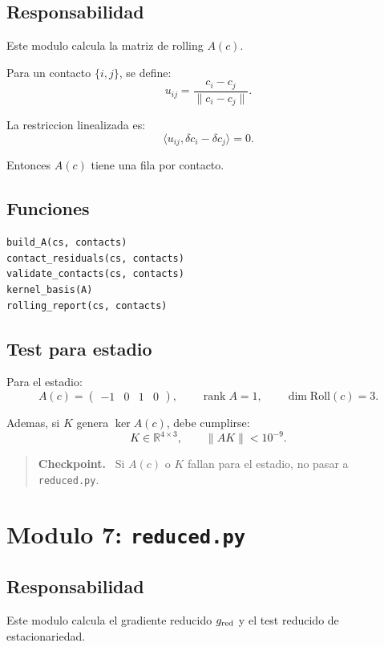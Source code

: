 \documentclass[11pt,letterpaper]{amsart}
\newcommand{\R}{\mathbb R}
\newcommand{\Roll}{\mathrm{Roll}}
\DeclareMathOperator{\Ker}{ker}
\DeclareMathOperator{\rank}{rank}
\newenvironment{checkpoint}
{\par\medskip\noindent\begin{quote}\textbf{Checkpoint.}\ }
{\end{quote}\par\medskip}
\begin{document}
\subsection{Responsabilidad}

Este modulo calcula la matriz de rolling \(A(c)\).

Para un contacto \(\{i,j\}\), se define:
\[
u_{ij}=\frac{c_i-c_j}{\|c_i-c_j\|}.
\]

La restriccion linealizada es:
\[
\langle u_{ij},\delta c_i-\delta c_j\rangle=0.
\]

Entonces \(A(c)\) tiene una fila por contacto.

\subsection{Funciones}

\begin{verbatim}
build_A(cs, contacts)
contact_residuals(cs, contacts)
validate_contacts(cs, contacts)
kernel_basis(A)
rolling_report(cs, contacts)
\end{verbatim}

\subsection{Test para estadio}

Para el estadio:
\[
A(c)=
\begin{pmatrix}
-1&0&1&0
\end{pmatrix},
\qquad
\rank A=1,
\qquad
\dim\Roll(c)=3.
\]

Ademas, si \(K\) genera \(\Ker A(c)\), debe cumplirse:
\[
K\in\R^{4\times 3},
\qquad
\|AK\|<10^{-9}.
\]

\begin{checkpoint}
Si \(A(c)\) o \(K\) fallan para el estadio, no pasar a \texttt{reduced.py}.
\end{checkpoint}

\section{Modulo 7: \texttt{reduced.py}}

\subsection{Responsabilidad}

Este modulo calcula el gradiente reducido \(g_{\rm red}\) y el test reducido de
estacionariedad.
\end{document}

